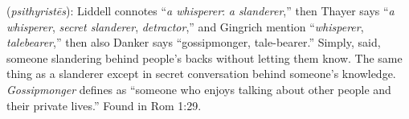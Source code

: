 \item[Gossipmonger,]

(\textit{psithyristēs}):
Liddell connotes ``\emph{a whisperer}: \emph{a slanderer},'' then Thayer says ``\emph{a whisperer}, \emph{secret slanderer}, \emph{detractor},'' and Gingrich mention ``\emph{whisperer}, \emph{talebearer},'' then also Danker says ``gossipmonger, tale-bearer.'' Simply, said, someone slandering behind people's backs without letting them know. The same thing as a slanderer except in secret conversation behind someone's knowledge. \emph{Gossipmonger} defines as ``someone who enjoys talking about other people and their private lives.''
Found in Rom 1:29.

